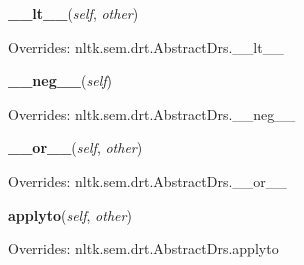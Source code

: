     \vspace{0.5ex}

\hspace{.8\funcindent}\begin{boxedminipage}{\funcwidth}

    \raggedright \textbf{\_\_lt\_\_}(\textit{self}, \textit{other})

\setlength{\parskip}{2ex}
\setlength{\parskip}{1ex}
      Overrides: nltk.sem.drt.AbstractDrs.\_\_lt\_\_

    \end{boxedminipage}

    \vspace{0.5ex}

\hspace{.8\funcindent}\begin{boxedminipage}{\funcwidth}

    \raggedright \textbf{\_\_neg\_\_}(\textit{self})

\setlength{\parskip}{2ex}
\setlength{\parskip}{1ex}
      Overrides: nltk.sem.drt.AbstractDrs.\_\_neg\_\_

    \end{boxedminipage}

    \vspace{0.5ex}

\hspace{.8\funcindent}\begin{boxedminipage}{\funcwidth}

    \raggedright \textbf{\_\_or\_\_}(\textit{self}, \textit{other})

\setlength{\parskip}{2ex}
\setlength{\parskip}{1ex}
      Overrides: nltk.sem.drt.AbstractDrs.\_\_or\_\_

    \end{boxedminipage}

    \vspace{0.5ex}

\hspace{.8\funcindent}\begin{boxedminipage}{\funcwidth}

    \raggedright \textbf{applyto}(\textit{self}, \textit{other})

\setlength{\parskip}{2ex}
\setlength{\parskip}{1ex}
      Overrides: nltk.sem.drt.AbstractDrs.applyto

    \end{boxedminipage}

    \vspace{0.5ex}

